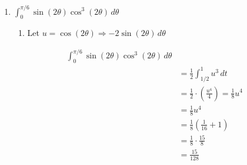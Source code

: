 \documentclass[letter,11pt]{article}
\begin{document}
\begin{enumerate}[label=\roman*.]
    \item $\int_{0}^{\pi/6} \sin (2\theta)\cos^3(2\theta) \, d\theta$
        \begin{enumerate}
            \item Let $u = \cos(2\theta) \Longrightarrow -2\sin(2\theta) \, d\theta$
        \end{enumerate}
    \begin{align*}
        \int_{0}^{\pi/6} \sin (2\theta)\cos^3(2\theta) \, d\theta \\
        &= \frac{1}{2} \int_{1/2}^{1} u^3 \, dt \\ 
        &= \frac{1}{2} \cdot\left(\frac{u^4}{4}\right) = \frac{1}{8}u^4\\
        &= \frac{1}{8}u^4 \\ 
        &= \frac{1}{8}\left(\frac{1}{16}+ 1\right)\\
        &= \frac{1}{8} \cdot \frac{15}{8} \\
        &= \boxed{\frac{15}{128}}
    \end{align*}
    

\end{enumerate}
\end{document}
